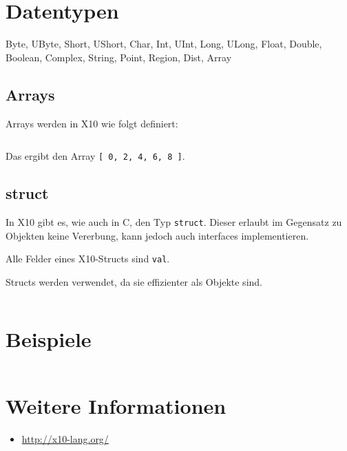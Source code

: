 \section{Datentypen}
Byte, UByte, Short, UShort, Char, Int, UInt, Long, ULong, Float, Double, Boolean, 
Complex, String, Point, Region, Dist, Array

\subsection{Arrays}%
Arrays werden in X10 wie folgt definiert:

\inputminted[numbersep=5pt, tabsize=4]{scala}{scripts/x10/array-example.x10}

Das ergibt den Array \texttt{[ 0, 2, 4, 6, 8 ]}.

\subsection{struct}%
In X10 gibt es, wie auch in C, den Typ \texttt{struct}. Dieser erlaubt im Gegensatz
zu Objekten keine Vererbung, kann jedoch auch interfaces implementieren.

Alle Felder eines X10-Structs sind \texttt{val}.

Structs werden verwendet, da sie effizienter als Objekte sind.

\begin{beispiel}[struct]
    \inputminted[numbersep=5pt, tabsize=4]{scala}{scripts/x10/x10-struct-example.x10}
\end{beispiel}

\section{Beispiele}

\inputminted[linenos, numbersep=5pt, tabsize=4, frame=lines, label=Fibonacci.x10]{scala}{scripts/x10/Fibonacci.x10}

\section{Weitere Informationen}
\begin{itemize}
    \item \url{http://x10-lang.org/}
\end{itemize}
